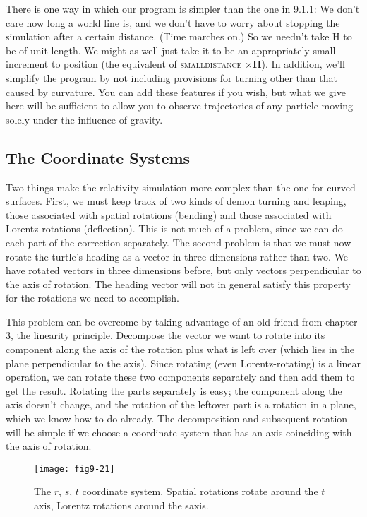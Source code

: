 \documentclass{book}
\begin{document}
There is one way in which our program is simpler than the one in
9.1.1: We don't care how long a world line is, and we don't have to
worry about stopping the simulation after a certain distance. (Time
marches on.) So we needn't take H to be of unit length. We might
as well just take it to be an appropriately small increment to position
(the equivalent of \textsc{smalldistance} $\times \mathbf{H}$). In addition, we'll simplify the
program by not including provisions for turning other than that caused
by curvature. You can add these features if you wish, but what we give
here will be sufficient to allow you to observe trajectories of any particle
moving solely under the influence of gravity.

\subsection{The Coordinate Systems}

Two things make the relativity simulation more complex than the one for
curved surfaces. First, we must keep track of two kinds of demon turning
and leaping, those associated with spatial rotations (bending) and those
associated with Lorentz rotations (deflection). This is not much of a
problem, since we can do each part of the correction separately. The
second problem is that we must now rotate the turtle's heading as a
vector in three dimensions rather than two. We have rotated vectors in
three dimensions before, but only vectors perpendicular to the axis of
rotation. The heading vector will not in general satisfy this property for
the rotations we need to accomplish.

This problem can be overcome by taking advantage of an old friend
from chapter 3, the linearity principle. Decompose the vector we want
to rotate into its component along the axis of the rotation plus what
is left over (which lies in the plane perpendicular to the axis). Since
rotating (even Lorentz-rotating) is a linear operation, we can rotate
these two components separately and then add them to get the result.
Rotating the parts separately is easy; the component along the axis
doesn't change, and the rotation of the leftover part is a rotation in
a plane, which we know how to do already. The decomposition and
subsequent rotation will be simple if we choose a coordinate system that
has an axis coinciding with the axis of rotation.

\begin{figure}
\begin{center}
\texttt{[image: fig9-21]}
\caption{The $r$, $s$, $t$ coordinate system. Spatial rotations rotate around the $t$ axis, Lorentz rotations around the saxis.}
\end{center}
\end{figure}
\end{document}
